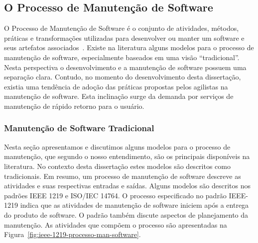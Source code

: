
\subsection{O Processo de Manutenção de Software}
\label{sec:o_processo_de_manutecao_de_software}

O Processo de Manutenção de Software é o conjunto de atividades, métodos,
práticas e transformações utilizadas para desenvolver ou manter um software e
seus artefatos associados~\cite{paulk1993key}. Existe na literatura alguns
modelos para o processo de manutenção de software, especialmente baseados em uma
visão ``tradicional''. Nesta perspectiva o desenvolvimento e a manutenção de
software possuem uma separação clara. Contudo, no momento do desenvolvimento
desta dissertação, existia uma tendência de adoção das práticas propostas pelos
agilistas na manutenção de software. Esta inclinação surge da demanda por
serviços de manutenção de rápido retorno para o usuário.


\subsubsection{Manutenção de Software Tradicional}
\label{subsec:manutenção_de_software_tradicional}

Nesta seção apresentamos e discutimos alguns modelos para o processo de
manutenção, que segundo o nosso entendimento, são os principais disponíveis na
literatura. No contexto desta dissertação estes modelos são descritos como
tradicionais. Em resumo, um processo de manutenção de software descreve as
atividades e suas respectivas entradas e saídas. Alguns modelos são descritos
nos padrões IEEE 1219 e ISO/IEC 14764. O processo especificado no padrão
IEEE\@-\@1219 indica que as atividades de manutenção de software iniciem após a
entrega do produto de software. O padrão também discute aspectos de planejamento
da manutenção. As atividades que compõem o processo são apresentadas na
Figura~\ref{fig:ieee-1219-processo-man-software}.

